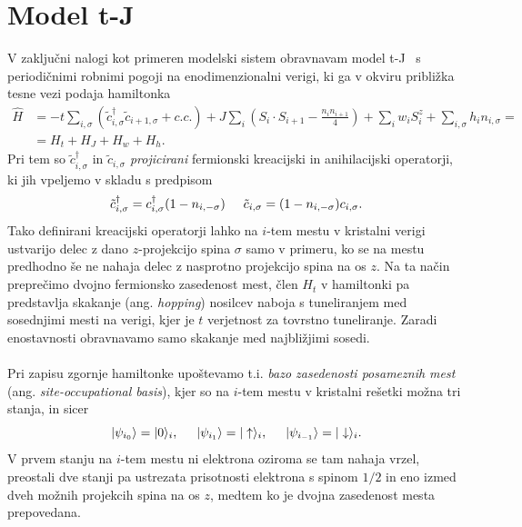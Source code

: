 \documentclass[10pt,a4paper]{article}
\begin{document}
\section{Model t-J}
V zaključni nalogi kot primeren modelski sistem obravnavam model t-J~\cite{spalek2007tj} s periodičnimi robnimi pogoji na enodimenzionalni verigi, ki ga v okviru približka tesne vezi podaja hamiltonka 
\begin{equation}\label{eq:tJ_ham}
\begin{split}
\hat{H}&=-t\sum\limits_{i, \sigma} \left(\tilde{c}_{i,\sigma}^\dagger\tilde{c}_{i+1,\sigma} + c.c. \right) + J\sum\limits_i \left(S_i\cdot S_{i+1} - \frac{n_i n_{i+1}}{4}\right) + \sum\limits_i w_iS_i^z + \sum\limits_{i,\sigma} h_i n_{i,\sigma}=  \\
&=
H_t + H_J + H_w + H_h.
\end{split}
\end{equation} 
Pri tem so $\tilde{c}_{i,\sigma}^\dagger$ in  $\tilde{c}_{i,\sigma}$ \emph{projicirani} fermionski kreacijski in anihilacijski operatorji, ki jih vpeljemo v skladu s predpisom 
\begin{equation}
\tilde{c}_{i,\sigma}^\dagger=c_{i,\sigma}^\dagger(1-n_{i,-\sigma}) \hspace{5mm}\tilde{c}_{i,\sigma}=(1-n_{i,-\sigma})c_{i,\sigma}.
\end{equation}
Tako definirani kreacijski operatorji lahko na $i$-tem mestu v kristalni verigi ustvarijo delec z dano $z$-projekcijo spina $\sigma$ samo v primeru, ko se na mestu predhodno še ne nahaja delec z nasprotno projekcijo spina na os $z$. Na ta način preprečimo dvojno fermionsko zasedenost mest, člen $H_t$ v hamiltonki pa predstavlja skakanje (ang. \emph{hopping}) nosilcev naboja s tuneliranjem  med sosednjimi mesti na verigi, kjer je $t$ verjetnost za tovrstno tuneliranje. Zaradi enostavnosti obravnavamo samo skakanje med najbližjimi sosedi. \\\\ 
Pri zapisu zgornje hamiltonke upoštevamo t.i. \emph{bazo zasedenosti posameznih mest} (ang. \emph{site-occupational basis}), kjer so na $i$-tem mestu v kristalni rešetki možna tri stanja, in sicer 
$$
\vert\psi_{i_0}\rangle=\vert0\rangle_i, \hspace{5mm} \vert\psi_{i_1}\rangle=\vert\uparrow\rangle_i,\hspace{5mm} \vert\psi_{i_{-1}}\rangle=\vert\downarrow\rangle_i.
$$
V prvem stanju na $i$-tem mestu ni elektrona oziroma se tam nahaja vrzel, preostali dve stanji pa ustrezata prisotnosti elektrona s spinom $1/2$ in eno izmed dveh možnih projekcih spina na os $z$, medtem ko je dvojna zasedenost mesta prepovedana.  \\\\
\end{document}
